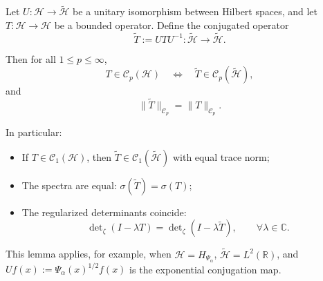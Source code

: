 \begin{lemma}
\label{lem:unitary_conjugation_trace_class}
Let \( U \colon \mathcal{H} \to \widetilde{\mathcal{H}} \) be a unitary isomorphism between Hilbert spaces, and let \( T \colon \mathcal{H} \to \mathcal{H} \) be a bounded operator. Define the conjugated operator
\[
\widetilde{T} := U T U^{-1} \colon \widetilde{\mathcal{H}} \to \widetilde{\mathcal{H}}.
\]

Then for all \( 1 \le p \le \infty \),
\[
T \in \mathcal{C}_p(\mathcal{H}) \quad \Longleftrightarrow \quad \widetilde{T} \in \mathcal{C}_p(\widetilde{\mathcal{H}}),
\]
and
\[
\| \widetilde{T} \|_{\mathcal{C}_p} = \| T \|_{\mathcal{C}_p}.
\]

\medskip
\noindent In particular:
\begin{itemize}
  \item If \( T \in \mathcal{C}_1(\mathcal{H}) \), then \( \widetilde{T} \in \mathcal{C}_1(\widetilde{\mathcal{H}}) \) with equal trace norm;
  \item The spectra are equal: \( \sigma(\widetilde{T}) = \sigma(T) \);
  \item The regularized determinants coincide:
  \[
  \det\nolimits_\zeta(I - \lambda T) = \det\nolimits_\zeta(I - \lambda \widetilde{T}), \qquad \forall \lambda \in \mathbb{C}.
  \]
\end{itemize}

\medskip
\noindent
This lemma applies, for example, when \( \mathcal{H} = H_{\Psi_\alpha} \), \( \widetilde{\mathcal{H}} = L^2(\mathbb{R}) \), and \( U f(x) := \Psi_\alpha(x)^{1/2} f(x) \) is the exponential conjugation map.
\end{lemma}
